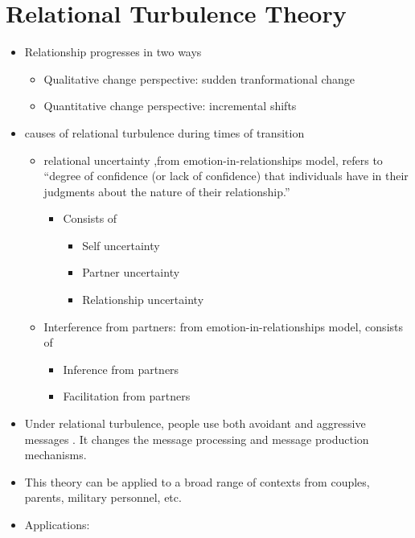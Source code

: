 \documentclass[
]{book}
\begin{document}
\hypertarget{relational-turbulence-theory}{%
\section{Relational Turbulence Theory}\label{relational-turbulence-theory}}

\begin{itemize}
\item
  Relationship progresses in two ways

  \begin{itemize}
  \item
    Qualitative change perspective: sudden tranformational change
  \item
    Quantitative change perspective: incremental shifts
  \end{itemize}
\item
  causes of relational turbulence during times of transition

  \begin{itemize}
  \item
    relational uncertainty ,from emotion-in-relationships model, refers to ``degree of confidence (or lack of confidence) that individuals have in their judgments about the nature of their relationship.'' \citep[.pp521]{Baxter_2008}

    \begin{itemize}
    \item
      Consists of

      \begin{itemize}
      \item
        Self uncertainty
      \item
        Partner uncertainty
      \item
        Relationship uncertainty
      \end{itemize}
    \end{itemize}
  \item
    Interference from partners: from emotion-in-relationships model, consists of

    \begin{itemize}
    \item
      Inference from partners
    \item
      Facilitation from partners
    \end{itemize}
  \end{itemize}
\item
  Under relational turbulence, people use both avoidant and aggressive messages \citep[.pp523]{Baxter_2008}. It changes the message processing and message production mechanisms.
\item
  This theory can be applied to a broad range of contexts from couples, parents, military personnel, etc.
\item
  Applications:


\end{itemize}
\end{document}
